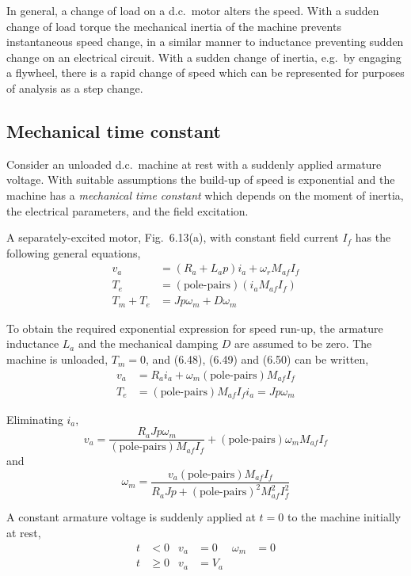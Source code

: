 \documentclass[a4paper,numbers=noenddot,12pt]{scrbook}
\begin{document}
In general, a change of load on a d.c.\ motor alters the speed. With a sudden change of load torque the mechanical inertia of the machine prevents instantaneous speed change, in a similar manner to inductance preventing sudden change on an electrical circuit. With a sudden change of inertia, e.g.\ by engaging a flywheel, there is a rapid change of speed which can be represented for purposes of analysis as a step change.

\subsection{Mechanical time constant}
Consider an unloaded d.c.\ machine at rest with a suddenly applied armature voltage. With suitable assumptions the build-up of speed is exponential and the machine has a \textit{mechanical time constant} which depends on the moment of inertia, the electrical parameters, and the field excitation.

A separately-excited motor, Fig.\ 6.13(a), with constant field current $I_f$ has the following general equations,
\begin{align}
    v_a & = (R_a + L_a p)i_a + \omega_r M_{af} I_f \\
    T_e & = (\text{pole-pairs})(i_a M_{af} I_f) \\
    T_m + T_e & = J p \omega_m + D \omega_m  
    \label{}
\end{align}

To obtain the required exponential expression for speed run-up, the armature inductance $L_a$ and the mechanical damping $D$ are assumed to be zero. The machine is unloaded, $T_m = 0$, and (6.48), (6.49) and (6.50) can be written,
\begin{align}
    v_a & = R_a i_a + \omega_m (\text{pole-pairs}) M_{af} I_f \\
    T_e & = (\text{pole-pairs})M_{af} I_f i_a = J p \omega_m
    \label{}
\end{align}

Eliminating $i_a$,
\begin{equation}
    v_a = \dfrac{R_a J p \omega_m}{(\text{pole-pairs}) M_{af} I_f} + (\text{pole-pairs}) \omega_m M_{af} I_f
    \label{}
\end{equation}
and
\begin{equation}
    \omega_m = \dfrac{v_a (\text{pole-pairs}) M_{af} I_f}{R_a J p + {(\text{pole-pairs})}^2 M_{af}^2 I_f^2}
    \label{}
\end{equation}

A constant armature voltage is suddenly applied at $t = 0$ to the machine initially at rest,
\begin{align*}
    t & < 0 & v_a & = 0 & \omega_m & = 0\\
    t & \ge 0 & v_a & = V_a
\end{align*}
\end{document}
